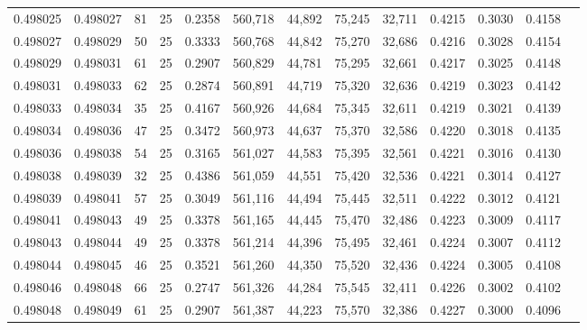 \begin{tabular}{rrrrrrrrrrrrr}
0.498025 & 0.498027 &    81 &  25 &                                     0.2358 & 560,718 &  44,892 &  75,245 &  32,711 & 0.4215 & 0.3030 & 0.4158 \\
0.498027 & 0.498029 &    50 &  25 &                                     0.3333 & 560,768 &  44,842 &  75,270 &  32,686 & 0.4216 & 0.3028 & 0.4154 \\
0.498029 & 0.498031 &    61 &  25 &                                     0.2907 & 560,829 &  44,781 &  75,295 &  32,661 & 0.4217 & 0.3025 & 0.4148 \\
0.498031 & 0.498033 &    62 &  25 &                                     0.2874 & 560,891 &  44,719 &  75,320 &  32,636 & 0.4219 & 0.3023 & 0.4142 \\
0.498033 & 0.498034 &    35 &  25 &                                     0.4167 & 560,926 &  44,684 &  75,345 &  32,611 & 0.4219 & 0.3021 & 0.4139 \\
0.498034 & 0.498036 &    47 &  25 &                                     0.3472 & 560,973 &  44,637 &  75,370 &  32,586 & 0.4220 & 0.3018 & 0.4135 \\
0.498036 & 0.498038 &    54 &  25 &                                     0.3165 & 561,027 &  44,583 &  75,395 &  32,561 & 0.4221 & 0.3016 & 0.4130 \\
0.498038 & 0.498039 &    32 &  25 &                                     0.4386 & 561,059 &  44,551 &  75,420 &  32,536 & 0.4221 & 0.3014 & 0.4127 \\
0.498039 & 0.498041 &    57 &  25 &                                     0.3049 & 561,116 &  44,494 &  75,445 &  32,511 & 0.4222 & 0.3012 & 0.4121 \\
0.498041 & 0.498043 &    49 &  25 &                                     0.3378 & 561,165 &  44,445 &  75,470 &  32,486 & 0.4223 & 0.3009 & 0.4117 \\
0.498043 & 0.498044 &    49 &  25 &                                     0.3378 & 561,214 &  44,396 &  75,495 &  32,461 & 0.4224 & 0.3007 & 0.4112 \\
0.498044 & 0.498045 &    46 &  25 &                                     0.3521 & 561,260 &  44,350 &  75,520 &  32,436 & 0.4224 & 0.3005 & 0.4108 \\
0.498046 & 0.498048 &    66 &  25 &                                     0.2747 & 561,326 &  44,284 &  75,545 &  32,411 & 0.4226 & 0.3002 & 0.4102 \\
0.498048 & 0.498049 &    61 &  25 &                                     0.2907 & 561,387 &  44,223 &  75,570 &  32,386 & 0.4227 & 0.3000 & 0.4096 \\

\end{tabular}
